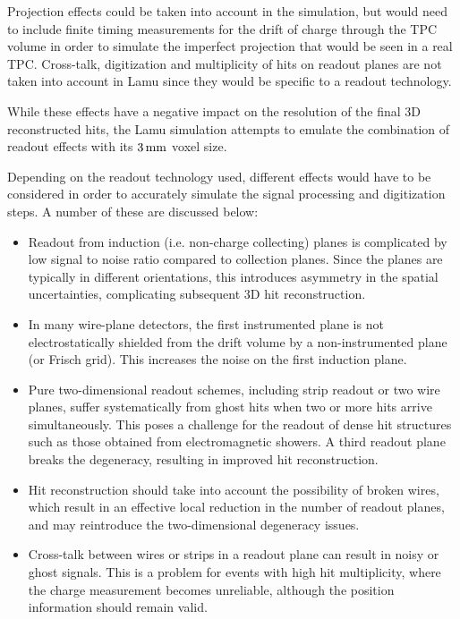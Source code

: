 Projection effects could be taken into account in the simulation, but would need to include finite timing measurements for the drift of charge through the TPC volume in order to simulate the imperfect projection that would be seen in a real TPC. Cross-talk, digitization and multiplicity of hits on readout planes are not taken into account in Lamu since they would be specific to a readout technology.

While these effects have a negative impact on the resolution of the final 3D reconstructed hits, the Lamu simulation attempts to emulate the combination of readout effects with its $3\,\mathrm{mm}$ voxel size.

Depending on the readout technology used, different effects would have to be considered in order to accurately simulate the signal processing and digitization steps. A number of these are discussed below:

\begin{itemize}
    \item Readout from induction (i.e. non-charge collecting) planes is complicated by low signal to noise ratio compared to collection planes. Since the planes are typically in different orientations, this introduces asymmetry in the spatial uncertainties, complicating subsequent 3D hit reconstruction.
        
    \item In many wire-plane detectors, the first instrumented plane is not electrostatically shielded from the drift volume by a non-instrumented plane (or Frisch grid). This increases the noise on the first induction plane.

    \item Pure two-dimensional readout schemes, including strip readout or two wire planes, suffer systematically from ghost hits when two or more hits arrive simultaneously. This poses a challenge for the readout of dense hit structures such as those obtained from electromagnetic showers. A third readout plane breaks the degeneracy, resulting in improved hit reconstruction.

    \item Hit reconstruction should take into account the possibility of broken wires, which result in an effective local reduction in the number of readout planes, and may reintroduce the two-dimensional degeneracy issues.

    \item Cross-talk between wires or strips in a readout plane can result in noisy or ghost signals. This is a problem for events with high hit multiplicity, where the charge measurement becomes unreliable, although the position information should remain valid.
\end{itemize}

